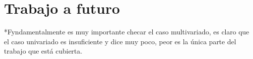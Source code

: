 
\section{Trabajo a futuro}

*Fyndamentalmente es muy importante checar el caso multivariado, es claro que el caso univariado
es insuficiente y dice muy poco, peor es la \'unica parte del trabajo que est\'a cubierta.


